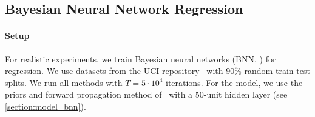 
% 







  \vspace{-0.1in}
\subsection{Bayesian Neural Network Regression}\label{section:bnn}
  \vspace{-0.07in}
\paragraph{Setup}
For realistic experiments, we train Bayesian neural networks (BNN, \citealt{neal_bayesian_1996}) for regression.
We use datasets from the UCI repository~\citep{Dua:2019} with 90\% random train-test splits.
We run all methods with \(T=5\cdot10^4\) iterations.
For the model, we use the priors and forward propagation method of~\citet{pmlr-v37-hernandez-lobatoc15} with a \(50\)-unit hidden layer (see \cref{section:model_bnn}).

